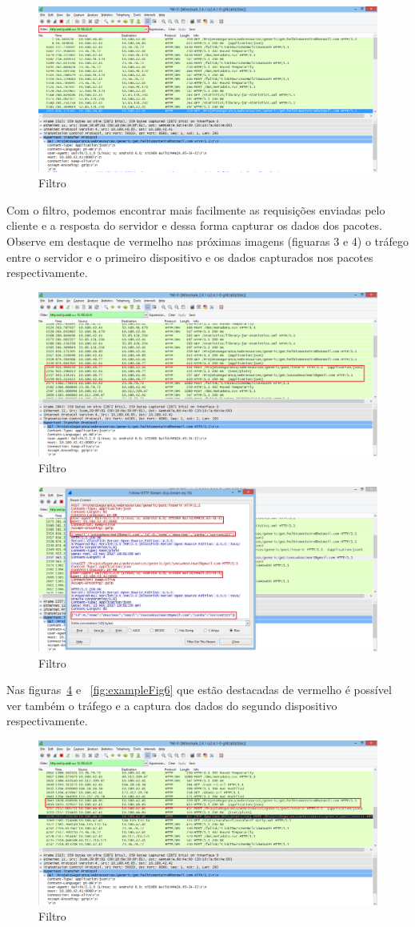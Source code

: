 \documentclass[12pt]{article}
\begin{document}
\begin{figure}[ht]
\centering
\includegraphics[width=.5\textwidth]{filtro.png}
\caption{Filtro}
\label{fig:exampleFig2}
\end{figure}

Com o filtro, podemos encontrar mais facilmente as requisições enviadas pelo cliente e a resposta do servidor e dessa forma capturar os dados dos pacotes. Observe em destaque de vermelho nas próximas imagens (figuaras 3 e 4) o tráfego entre o servidor e o primeiro dispositivo e os dados capturados nos pacotes respectivamente.  

\begin{figure}[ht]
\centering
\includegraphics[width=.5\textwidth]{encontrar.png}
\caption{Filtro}
\label{fig:exampleFig3}
\end{figure}

\begin{figure}[ht]
\centering
\includegraphics[width=.5\textwidth]{3.png}
\caption{Filtro}
\label{fig:exampleFig4}
\end{figure}

Nas figuras~\ref{fig:exampleFig5} e ~\ref{fig:exampleFig6} que estão destacadas de vermelho é possível ver também o tráfego e a captura dos dados do segundo dispositivo respectivamente.

\begin{figure}[ht]
\centering
\includegraphics[width=.5\textwidth]{01.png}
\caption{Filtro}
\label{fig:exampleFig5}
\end{figure}
\end{document}
